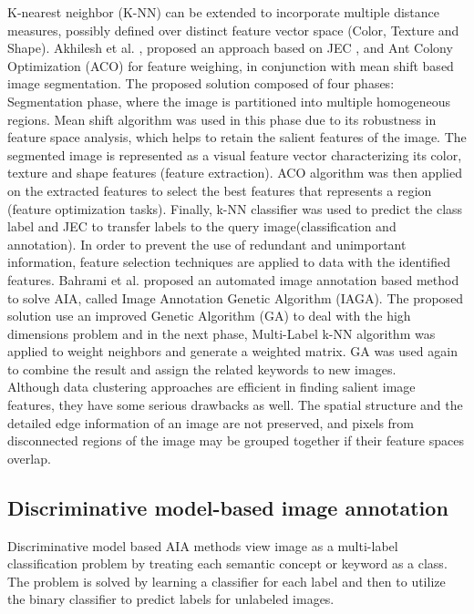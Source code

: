\documentclass[conference]{IEEEtran}
\begin{document}
		K-nearest neighbor (K-NN) can be extended to incorporate multiple distance measures,
possibly defined over distinct feature vector space (Color, Texture and Shape). Akhilesh
et al. \cite{b7}, proposed an approach based on JEC \cite{b6}, and Ant Colony
Optimization (ACO) for feature weighing, in conjunction with mean shift based image
segmentation. The proposed solution composed of four phases: Segmentation phase, where
the image is partitioned into multiple homogeneous regions. Mean shift algorithm\cite{meanShift} was
used in this phase due to its robustness in feature space analysis, which
helps to retain the salient features of the image. The segmented image is represented as a
visual feature vector characterizing its color, texture and shape features (feature extraction).
ACO algorithm was then applied on the extracted features to select the best features that
represents a region (feature optimization tasks). Finally, k-NN classifier was used to predict
the class label and JEC to transfer labels to the query image(classification and annotation).
In order to prevent the use of redundant and unimportant information, feature selection
techniques are applied to data with the identified features. Bahrami et al.\cite{IAGA} proposed
an automated image annotation based method to solve AIA, called Image Annotation
Genetic Algorithm (IAGA). The proposed solution use an improved Genetic Algorithm
(GA) to deal with the high dimensions problem and in the next phase, Multi-Label k-NN
algorithm was applied to weight neighbors and generate a weighted matrix. GA was used
		again to combine the result and assign the related keywords to new images.\\
		
		Although data clustering approaches are efficient in finding salient image features,
they have some serious drawbacks as well. The spatial structure and the detailed edge
information of an image are not preserved, and pixels from disconnected regions of the
image may be grouped together if their feature spaces overlap.
	


	\subsection{Discriminative model-based image annotation}

		Discriminative model based AIA methods view image as a multi-label classification problem
by treating each semantic concept or keyword as a class. The problem is solved by learning a
classifier for each label and then to utilize the binary classifier to predict labels for unlabeled
images.\\
		
\end{document}

